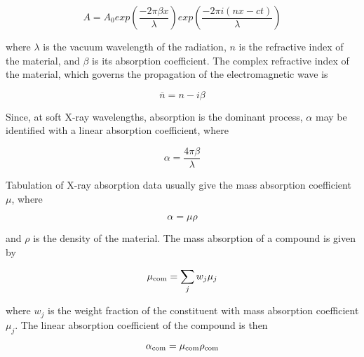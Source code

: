 \begin{equation}
A=A_0exp(\frac{-2 \pi \beta x}{\lambda})exp(\frac{-2 \pi i (nx-ct)}{\lambda})
\label{eq: amplitude}
\end{equation}

\begin{flushleft}
where $\lambda$ is the vacuum wavelength of the radiation, $n $ is the refractive index of the material, and $\beta $ is its absorption coefficient. The complex refractive index of the material, which governs the propagation of the electromagnetic wave is 
\end{flushleft}

\begin{equation}
\overline{n} = n - i \beta
\label{eq: n_comlex}
\end{equation}

\begin{flushleft}
Since, at soft X-ray wavelengths, absorption is the dominant process, $\alpha$ may be identified with a linear absorption coefficient, where
\end{flushleft}

\begin{equation}
\alpha = \frac{4 \pi \beta}{\lambda}
\label{eq: alpha1}
\end{equation}

\begin{flushleft}
Tabulation of X-ray absorption data usually give the mass absorption coefficient $\mu$, where
\end{flushleft}

\begin{equation}
\alpha = \mu \rho
\label{eq: alpha2}
\end{equation}

\begin{flushleft}
and $\rho $ is the density of the material. The mass absorption of a compound is given by
\end{flushleft}

\begin{equation}
\mu \textsubscript{com} = \sum_{j} w_j \mu_j
\label{eq: mu_com}
\end{equation}

\begin{flushleft}
where $w_j$ is the weight fraction of the constituent with mass absorption coefficient $\mu_j$. The linear absorption coefficient of the compound is then 
\end{flushleft}

\begin{equation}
\alpha \textsubscript{com} = \mu \textsubscript{com} \rho \textsubscript{com}
\label{eq: alpha com}
\end{equation}

